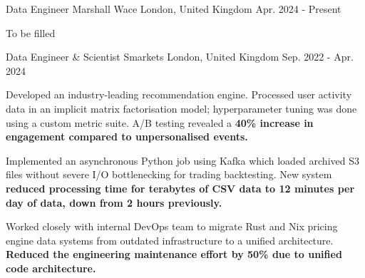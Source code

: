 

\begin{cventries}

  \cventry
    {Data Engineer} %
    {Marshall Wace} %
    {London, United Kingdom} %
    {Apr. 2024 - Present} %
    {
      \begin{cvitems} %
        \item {To be filled}
      \end{cvitems}
    }

  \cventry
    {Data Engineer \& Scientist} %
    {Smarkets} %
    {London, United Kingdom} %
    {Sep. 2022 - Apr. 2024} %
    {
      \begin{cvitems} %
        \item {Developed an industry-leading recommendation engine. Processed user activity data in an implicit matrix factorisation model; hyperparameter tuning was done using a custom metric suite. A/B testing revealed a \bf{40\% increase in engagement} compared to unpersonalised events.}
        \item {Implemented an asynchronous Python job using Kafka which loaded archived S3 files without severe I/O bottlenecking for trading backtesting. New system \bf{reduced processing time for terabytes of CSV data to 12 minutes} per day of data, down from 2 hours previously.}
        \item {Worked closely with internal DevOps team to migrate Rust and Nix pricing engine data systems from outdated infrastructure to a unified architecture. \bf{Reduced the engineering maintenance effort by 50\%} due to unified code architecture.}
      \end{cvitems}
    }


\end{cventries}
